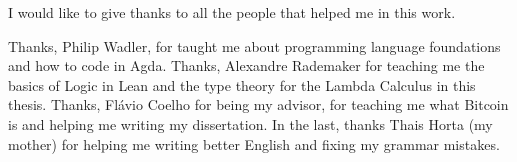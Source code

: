 \subtitle{Acknowledgment}

I would like to give thanks to all the people that helped me in this work.

Thanks, Philip Wadler,
for taught me about programming language foundations and how to code in Agda.
Thanks, Alexandre Rademaker for teaching me the basics of Logic in Lean
and the type theory for the Lambda Calculus in this thesis.
Thanks, Flávio Coelho for being my advisor, for teaching me what Bitcoin is
and helping me writing my dissertation.
In the last, thanks Thais Horta (my mother) for helping me writing better English
and fixing my grammar mistakes.
